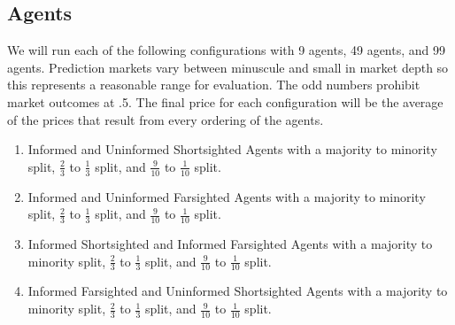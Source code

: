 \subsection{Agents}
We will run each of the following configurations with 9 agents, 49 agents, and 99 agents. Prediction markets vary between minuscule and small in market depth so this represents a reasonable range for evaluation. The odd numbers prohibit market outcomes at .5. The final price for each configuration will be the average of the prices that result from every ordering of the agents.
\begin{enumerate}
\item Informed and Uninformed Shortsighted Agents with a majority to minority split, $\frac{2}{3}$ to $\frac{1}{3}$ split, and $\frac{9}{10}$ to $\frac{1}{10}$ split.
\item Informed and Uninformed Farsighted Agents with a majority to minority split, $\frac{2}{3}$ to $\frac{1}{3}$ split, and $\frac{9}{10}$ to $\frac{1}{10}$ split.
\item Informed Shortsighted and Informed Farsighted Agents with a majority to minority split, $\frac{2}{3}$ to $\frac{1}{3}$ split, and $\frac{9}{10}$ to $\frac{1}{10}$ split.
\item Informed Farsighted and Uninformed Shortsighted Agents with a majority to minority split, $\frac{2}{3}$ to $\frac{1}{3}$ split, and $\frac{9}{10}$ to $\frac{1}{10}$ split.
\end{enumerate}

